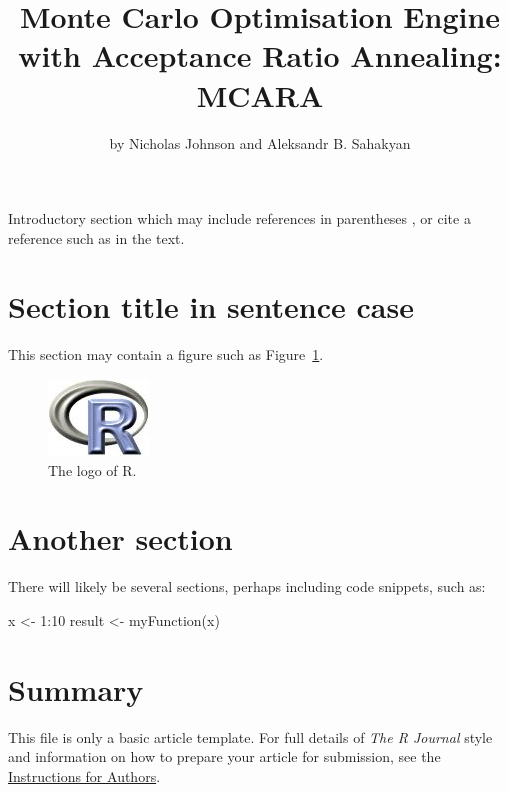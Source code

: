 \title{Monte Carlo Optimisation Engine with Acceptance Ratio Annealing: MCARA}
\author{by Nicholas Johnson and Aleksandr B. Sahakyan}

\maketitle


Introductory section which may include references in parentheses
\citep{R}, or cite a reference such as \citet{R} in the text.

\section{Section title in sentence case}

This section may contain a figure such as Figure~\ref{figure:rlogo}.

\begin{figure}[htbp]
  \centering
  \includegraphics{Rlogo}
  \caption{The logo of R.}
  \label{figure:rlogo}
\end{figure}

\section{Another section}

There will likely be several sections, perhaps including code snippets, such as:

\begin{example}
  x <- 1:10
  result <- myFunction(x)
\end{example}

\section{Summary}

This file is only a basic article template. For full details of \emph{The R Journal} style and information on how to prepare your article for submission, see the \href{http://journal.r-project.org/latex/RJauthorguide.pdf}{Instructions for Authors}.




